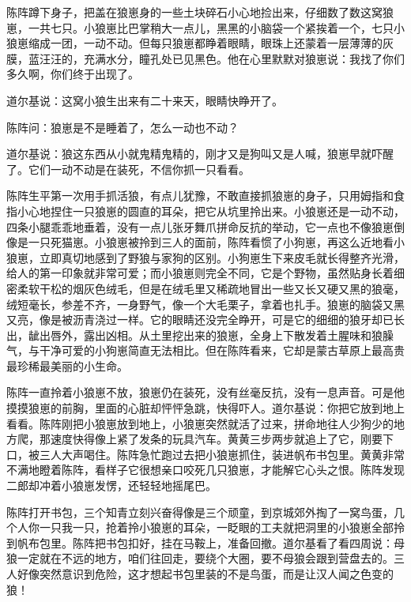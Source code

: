 \par 陈阵蹲下身子，把盖在狼崽身的一些土块碎石小心地捡出来，仔细数了数这窝狼崽，一共七只。小狼崽比巴掌稍大一点儿，黑黑的小脑袋一个紧挨着一个，七只小狼崽缩成一团，一动不动。但每只狼崽都睁着眼睛，眼珠上还蒙着一层薄薄的灰膜，蓝汪汪的，充满水分，瞳孔处已见黑色。他在心里默默对狼崽说：我找了你们多久啊，你们终于出现了。
\par 道尔基说：这窝小狼生出来有二十来天，眼睛快睁开了。
\par 陈阵问：狼崽是不是睡着了，怎么一动也不动？
\par 道尔基说：狼这东西从小就鬼精鬼精的，刚才又是狗叫又是人喊，狼崽早就吓醒了。它们一动不动是在装死，不信你抓一只看看。
\par 陈阵生平第一次用手抓活狼，有点儿犹豫，不敢直接抓狼崽的身子，只用姆指和食指小心地捏住一只狼崽的圆直的耳朵，把它从坑里拎出来。小狼崽还是一动不动，四条小腿乖乖地垂着，没有一点儿张牙舞爪拼命反抗的举动，它一点也不像狼崽倒像是一只死猫崽。小狼崽被拎到三人的面前，陈阵看惯了小狗崽，再这么近地看小狼崽，立即真切地感到了野狼与家狗的区别。小狗崽生下来皮毛就长得整齐光滑，给人的第一印象就非常可爱；而小狼崽则完全不同，它是个野物，虽然贴身长着细密柔软干松的烟灰色绒毛，但是在绒毛里又稀疏地冒出一些又长又硬又黑的狼毫，绒短毫长，参差不齐，一身野气，像一个大毛栗子，拿着也扎手。狼崽的脑袋又黑又亮，像是被沥青浇过一样。它的眼睛还没完全睁开，可是它的细细的狼牙却已长出，龇出唇外，露出凶相。从土里挖出来的狼崽，全身上下散发着土腥味和狼臊气，与干净可爱的小狗崽简直无法相比。但在陈阵看来，它却是蒙古草原上最高贵最珍稀最美丽的小生命。
\par 陈阵一直拎着小狼崽不放，狼崽仍在装死，没有丝毫反抗，没有一息声音。可是他摸摸狼崽的前胸，里面的心脏却怦怦急跳，快得吓人。道尔基说：你把它放到地上看看。陈阵刚把小狼崽放到地上，小狼崽突然就活了过来，拼命地往人少狗少的地方爬，那速度快得像上紧了发条的玩具汽车。黄黄三步两步就追上了它，刚要下口，被三人大声喝住。陈阵急忙跑过去把小狼崽抓住，装进帆布书包里。黄黄非常不满地瞪着陈阵，看样子它很想亲口咬死几只狼崽，才能解它心头之恨。陈阵发现二郎却冲着小狼崽发愣，还轻轻地摇尾巴。
\par 陈阵打开书包，三个知青立刻兴奋得像是三个顽童，到京城郊外掏了一窝鸟蛋，几个人你一只我一只，抢着拎小狼崽的耳朵，一眨眼的工夫就把洞里的小狼崽全部拎到帆布包里。陈阵把书包扣好，挂在马鞍上，准备回撤。道尔基看了看四周说：母狼一定就在不远的地方，咱们往回走，要绕个大圈，要不母狼会跟到营盘去的。三人好像突然意识到危险，这才想起书包里装的不是鸟蛋，而是让汉人闻之色变的狼！






